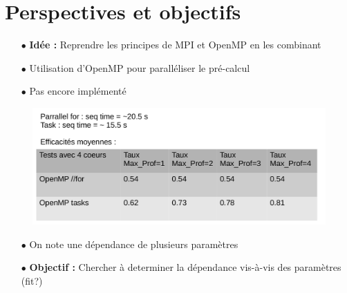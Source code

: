 \documentclass[usepdftitle=false,green]{beamer}
\begin{document}
\section{Perspectives et objectifs}

\begin{frame}
    \begin{center}
        \begin{itemize}
            \item[$\bullet$] \textbf{Idée : } Reprendre les principes de MPI et OpenMP en les combinant
            \item[$\bullet$] Utilisation d'OpenMP pour paralléliser le pré-calcul
            \item[$\bullet$] {\color{red} Pas encore implémenté}
        \end{itemize}
    \end{center}
\end{frame}



\begin{frame}
    \begin{center}
        \begin{figure}
            \includegraphics[scale=0.2]{pics/tab.png}
        \end{figure}
        \begin{itemize}
            \item[$\bullet$] On note une dépendance de plusieurs paramètres
            \item[$\bullet$] \textbf{Objectif : }Chercher à determiner la dépendance vis-à-vis des paramètres {\small (fit?)}
        \end{itemize}
    \end{center}
\end{frame}
\end{document}
